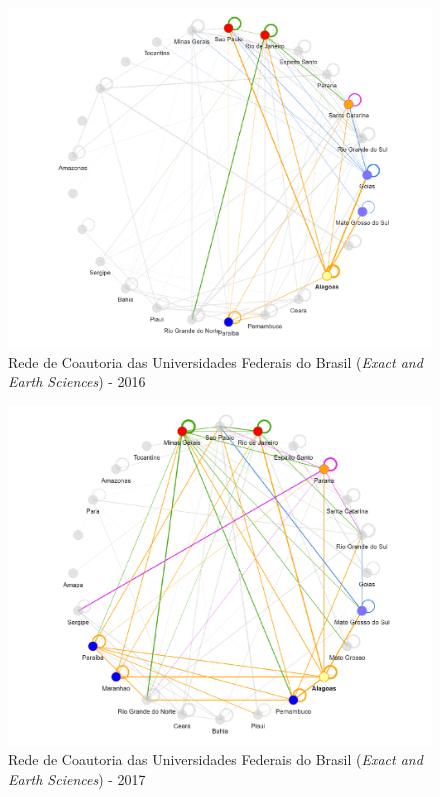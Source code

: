 \begin{figure}[H]
	\centering
	\includegraphics[scale=0.6]{Imagens/rede-exact-AL-2016.pdf}
	\caption{Rede de Coautoria das Universidades Federais do Brasil (\textit{Exact and Earth Sciences}) - 2016}
	\label{Rede de Coautoria - UF EXACT AL 2016}
\end{figure}

\begin{figure}[H]
	\centering
	\includegraphics[scale=0.6]{Imagens/rede-exact-AL-2017.pdf}
	\caption{Rede de Coautoria das Universidades Federais do Brasil (\textit{Exact and Earth Sciences}) - 2017}
	\label{Rede de Coautoria - UF EXACT AL 2017}
\end{figure}